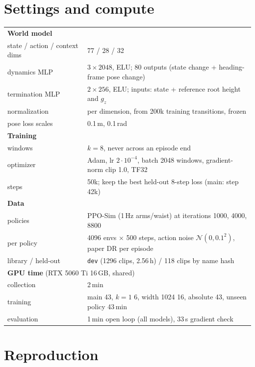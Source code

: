 \documentclass[10pt]{article}
\begin{document}
\clearpage
\appendix
\section{Settings and compute}

\begin{table}[H]
\centering\small
\begin{tabular}{ll}\toprule
\multicolumn{2}{l}{\textbf{World model}} \\
state / action / context dims & 77 / 28 / 32 \\
dynamics MLP & $3\times2048$, ELU; 80 outputs (state change + heading-frame pose change) \\
termination MLP & $2\times256$, ELU; inputs: state + reference root height and $g_z$ \\
normalization & per dimension, from 200k training transitions, frozen \\
pose loss scales & 0.1\,m, 0.1\,rad \\
\multicolumn{2}{l}{\textbf{Training}} \\
windows & $k = 8$, never across an episode end \\
optimizer & Adam, lr $2\cdot10^{-4}$, batch 2048 windows, gradient-norm clip 1.0, TF32 \\
steps & 50k; keep the best held-out 8-step loss (main: step 42k) \\
\multicolumn{2}{l}{\textbf{Data}} \\
policies & PPO-Sim (1\,Hz arms/waist) at iterations 1000, 4000, 8800 \\
per policy & 4096 envs $\times$ 500 steps, action noise $\mathcal N(0, 0.1^2)$, paper DR per episode \\
library / held-out & \texttt{dev} (1296 clips, 2.56\,h) / 118 clips by name hash \\
\multicolumn{2}{l}{\textbf{GPU time} (RTX 5060 Ti 16\,GB, shared)} \\
collection & 2\,min \\
training & main 43, $k{=}1$ 6, width 1024 16, absolute 43, unseen policy 43\,min \\
evaluation & 1\,min open loop (all models), 33\,s gradient check \\\bottomrule
\end{tabular}
\end{table}

\section{Reproduction}
\end{document}
